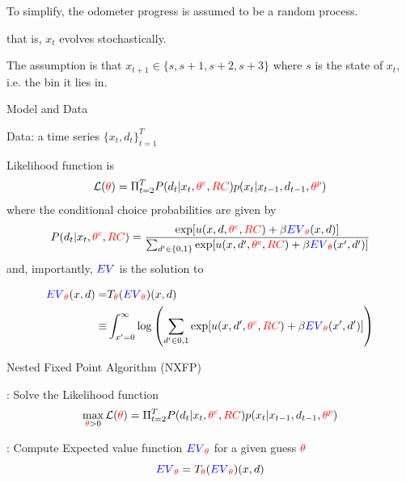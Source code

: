 \documentclass[english]{beamer}
\begin{document}
\begin{frame}{\cite{rustbus}}
\begin{midi}
\item To simplify, the odometer progress is assumed to be a random process.
\item that is, $x_t$ evolves stochastically.
\item The assumption is that $x_{t+1}\in\{s,s+1,s+2,s+3\}$ where $s$ is the state of $x_t$, i.e. the bin it lies in. 
\end{midi}

\end{frame}
	
\begin{frame}{Model and Data}
\begin{midi}
\item Data: a time series $\{x_t,d_t \}_{t=1}^T$
\item Likelihood function is
\begin{equation*}
\mathcal{L}({\color{red}{\theta}}) = \Pi_{t=2}^T P(d_t|x_t,{\color{red}{\theta^c}},{\color{red}{RC}})p(x_t|x_{t-1},d_{t-1},{\color{red}{\theta^p}})
\end{equation*}
where the conditional choice probabilities are given by
\begin{equation*}
P(d_t|x_t,{\color{red}{\theta^c}},{\color{red}{RC}}) = \frac{\exp[u(x,d,{\color{red}{\theta^c}},{\color{red}{RC}}) + \beta{\color{blue}{EV}}_{\color{red}{\theta}}(x,d)]}{\sum_{d'\in\{0,1\}}\exp[u(x,d',{\color{red}{\theta^c}},{\color{red}{RC}}) + \beta{\color{blue}{EV}}_{\color{red}{\theta}}(x',d')]}
\end{equation*}
and, importantly, ${\color{blue}{EV}}$ is the solution to

\begin{align*}
{\color{blue}{EV}}_{\color{red}{\theta}}(x,d) =& T_{\color{red}{\theta}}({\color{blue}{EV}}_{\color{red}{\theta}})(x,d) \\
                       \equiv&\int_{x'=0}^\infty \log \left( \sum_{d'\in{0,1}}\exp[u(x,d',{\color{red}{\theta^c}},{\color{red}{RC}}) + \beta{\color{blue}{EV}}_{\color{red}{\theta}}(x',d')] \right)
\end{align*}
\end{midi}
\end{frame}


\begin{frame}{Nested Fixed Point Algorithm (NXFP)}
\begin{widee}
\item {}: Solve the Likelihood function
\begin{equation*}
\max_{{\color{red}{\theta}}>0} \mathcal{L}({\color{red}{\theta}}) = \Pi_{t=2}^T P(d_t|x_t,{\color{red}{\theta^c}},{\color{red}{RC}})p(x_t|x_{t-1},d_{t-1},{\color{red}{\theta^p}})
\end{equation*}
\item {}: Compute Expected value function ${\color{blue}{EV}}_{\color{red}{\theta}}$ for a given guess ${\color{red}{\theta}}$
\begin{equation*}
{\color{blue}{EV}}_{\color{red}{\theta}} = T_{\color{red}{\theta}}({\color{blue}{EV}}_{\color{red}{\theta}})(x,d)
\end{equation*}
\end{widee}
\end{frame}
\end{document}
